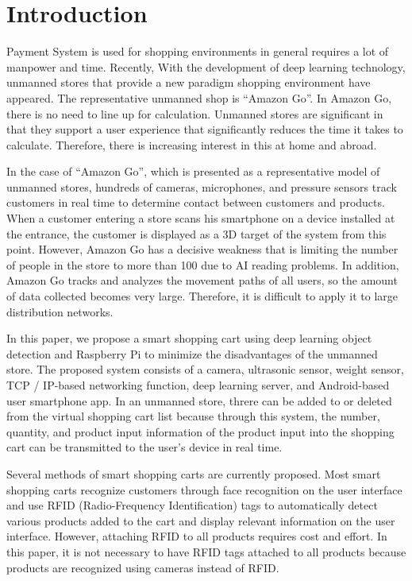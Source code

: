 \documentclass[smallextended]{svjour3}       %
\begin{document}
\def\spacingset#1{\renewcommand{\baselinestretch}%
{#1}\small\normalsize} \spacingset{1}


\hypertarget{introduction}{%
\section{Introduction}\label{introduction}}

Payment System is used for shopping environments in general requires a
lot of manpower and time. Recently, With the development of deep
learning technology, unmanned stores that provide a new paradigm
shopping environment have appeared. The representative unmanned shop is
``Amazon Go''. In Amazon Go, there is no need to line up for
calculation. Unmanned stores are significant in that they support a user
experience that significantly reduces the time it takes to calculate.
Therefore, there is increasing interest in this at home and
abroad\cite{wankhede2018just}.

In the case of ``Amazon Go'', which is presented as a representative
model of unmanned stores, hundreds of cameras, microphones, and pressure
sensors track customers in real time to determine contact between
customers and products. When a customer entering a store scans his
smartphone on a device installed at the entrance, the customer is
displayed as a 3D target of the system from this point. However, Amazon
Go has a decisive weakness that is limiting the number of people in the
store to more than 100 due to AI reading problems. In addition, Amazon
Go tracks and analyzes the movement paths of all users, so the amount of
data collected becomes very large. Therefore, it is difficult to apply
it to large distribution networks.

In this paper, we propose a smart shopping cart using deep learning
object detection and Raspberry Pi to minimize the disadvantages of the
unmanned store. The proposed system consists of a camera, ultrasonic
sensor, weight sensor, TCP / IP-based networking function, deep learning
server, and Android-based user smartphone app. In an unmanned store,
threre can be added to or deleted from the virtual shopping cart list
because through this system, the number, quantity, and product input
information of the product input into the shopping cart can be
transmitted to the user's device in real time.

Several methods of smart shopping carts are currently proposed. Most
smart shopping carts recognize customers through face recognition on the
user interface and use RFID (Radio-Frequency Identification) tags to
automatically detect various products added to the cart and display
relevant information on the user interface. However, attaching RFID to
all products requires cost and effort. In this paper, it is not
necessary to have RFID tags attached to all products because products
are recognized using cameras instead of
RFID\cite{chiang2016development, karjol2017iot}.
\end{document}
